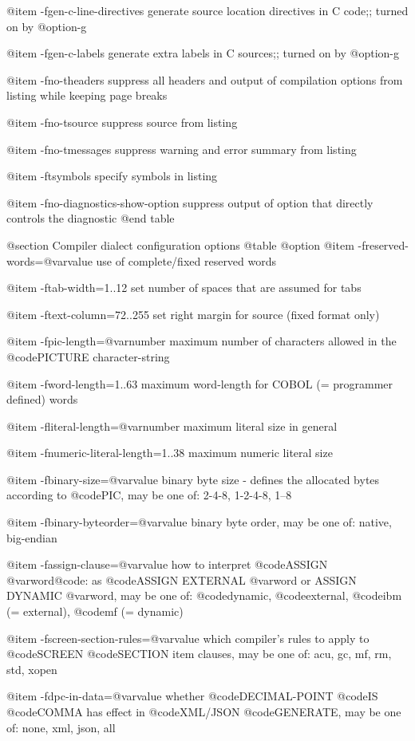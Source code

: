 @item -fgen-c-line-directives
generate source location directives in C code;; turned on by @option{-g}

@item -fgen-c-labels
generate extra labels in C sources;; turned on by @option{-g}

@item -fno-theaders
suppress all headers and output of compilation
options from listing while keeping page breaks

@item -fno-tsource
suppress source from listing

@item -fno-tmessages
suppress warning and error summary from listing

@item -ftsymbols
specify symbols in listing

@item -fno-diagnostics-show-option
suppress output of option that directly
controls the diagnostic
@end table

@section Compiler dialect configuration options
@table @option
@item -freserved-words=@var{value}
use of complete/fixed reserved words

@item -ftab-width=1..12
set number of spaces that are assumed for tabs

@item -ftext-column=72..255
set right margin for source (fixed format only)

@item -fpic-length=@var{number}
maximum number of characters allowed in the @code{PICTURE} character-string

@item -fword-length=1..63
maximum word-length for COBOL (= programmer defined) words

@item -fliteral-length=@var{number}
maximum literal size in general

@item -fnumeric-literal-length=1..38
maximum numeric literal size

@item -fbinary-size=@var{value}
binary byte size - defines the allocated bytes according to @code{PIC}, may be one of: 2-4-8, 1-2-4-8, 1--8

@item -fbinary-byteorder=@var{value}
binary byte order, may be one of: native, big-endian

@item -fassign-clause=@var{value}
how to interpret @code{ASSIGN @var{word}@code{: as @code{ASSIGN EXTERNAL @var{word}} or }ASSIGN DYNAMIC @var{word}}, may be one of: @code{dynamic}, @code{external}, @code{ibm} (= external), @code{mf} (= dynamic)

@item -fscreen-section-rules=@var{value}
which compiler's rules to apply to @code{SCREEN} @code{SECTION} item clauses, may be one of: acu, gc, mf, rm, std, xopen

@item -fdpc-in-data=@var{value}
whether @code{DECIMAL-POINT} @code{IS} @code{COMMA} has effect in @code{XML/JSON} @code{GENERATE}, may be one of: none, xml, json, all

